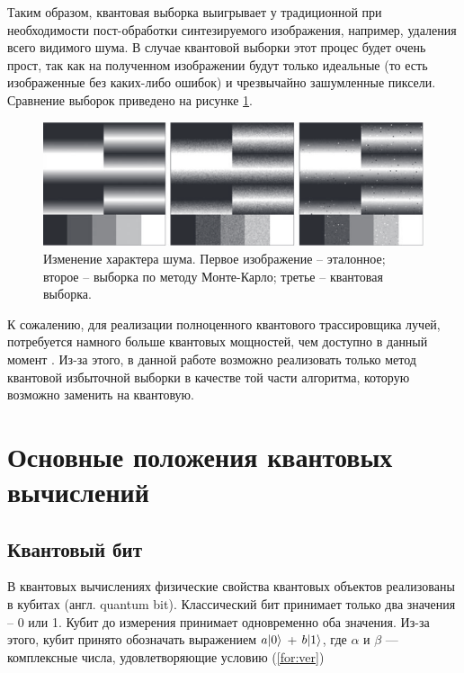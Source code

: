 Таким образом, квантовая выборка выигрывает у традиционной при необходимости пост-обработки синтезируемого изображения, например, удаления всего видимого шума. В случае квантовой выборки этот процес будет очень прост, так как на полученном изображении будут только идеальные (то есть изображенные без каких-либо ошибок) и чрезвычайно зашумленные пиксели. Сравнение выборок приведено на рисунке \ref{img:compare}.
 
\begin{figure}[H]
 	\begin{center}
 		\includegraphics[scale=0.7]{img/compare.png}
 	\end{center}
 	\captionsetup{justification=centering}
 	\caption{Изменение характера шума. Первое изображение -- эталонное; второе -- выборка по методу Монте-Карло; третье -- квантовая выборка.}
 	\label{img:compare}
\end{figure}

К сожалению, для реализации полноценного квантового трассировщика лучей, потребуется намного больше квантовых мощностей, чем доступно в данный момент \cite{PQC-limits}. Из-за этого, в данной работе возможно реализовать только метод квантовой избыточной выборки в качестве той части алгоритма, которую возможно заменить на квантовую.

\section{Основные положения квантовых вычислений}

\subsection{Квантовый бит}

В квантовых вычислениях физические свойства квантовых объектов реализованы в кубитах (англ. quantum bit). Классический бит принимает только два значения – 0 или 1. Кубит до измерения принимает одновременно оба значения. Из-за этого, кубит принято обозначать выражением $a\lvert0\rangle$ + $b\lvert1\rangle$, где $\alpha$ и $\beta$ — комплексные числа, удовлетворяющие условию (\ref{for:ver})

